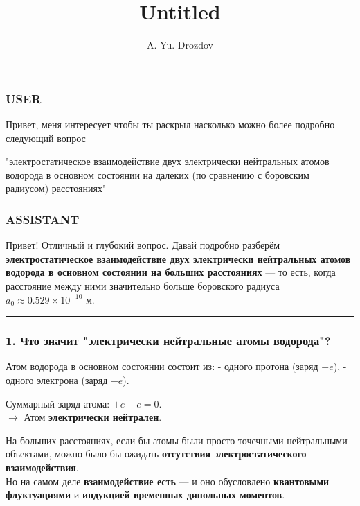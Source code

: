 \documentclass[11pt]{article}
\author{A. Yu. Drozdov}
\title{Untitled}
\begin{document}
    
    \maketitle
    
    

    
    \subsubsection{USER}\label{user}

Привет, меня интересует чтобы ты раскрыл насколько можно более подробно
следующий вопрос

"электростатическое взаимодействие двух электрически нейтральных атомов
водорода в основном состоянии на далеких (по сравнению с боровским
радиусом) расстояниях"

\subsubsection{ASSISTANT}\label{assistant}

Привет! Отличный и глубокий вопрос. Давай подробно разберём
\textbf{электростатическое взаимодействие двух электрически нейтральных
атомов водорода в основном состоянии на больших расстояниях} --- то
есть, когда расстояние между ними значительно больше боровского радиуса
\(a_0 \approx 0.529 \times 10^{-10}\) м.

\begin{center}\rule{0.5\linewidth}{\linethickness}\end{center}

\subsubsection{1. Что значит "электрически нейтральные атомы
водорода"?}\label{ux447ux442ux43e-ux437ux43dux430ux447ux438ux442-ux44dux43bux435ux43aux442ux440ux438ux447ux435ux441ux43aux438-ux43dux435ux439ux442ux440ux430ux43bux44cux43dux44bux435-ux430ux442ux43eux43cux44b-ux432ux43eux434ux43eux440ux43eux434ux430}

Атом водорода в основном состоянии состоит из: - одного протона (заряд
\(+e\)), - одного электрона (заряд \(-e\)).

Суммарный заряд атома: \(+e - e = 0\).\\
$\rightarrow$ Атом \textbf{электрически нейтрален}.

На больших расстояниях, если бы атомы были просто точечными нейтральными
объектами, можно было бы ожидать \textbf{отсутствия электростатического
взаимодействия}.\\
Но на самом деле \textbf{взаимодействие есть} --- и оно обусловлено
\textbf{квантовыми флуктуациями} и \textbf{индукцией временных дипольных
моментов}.
\end{document}
